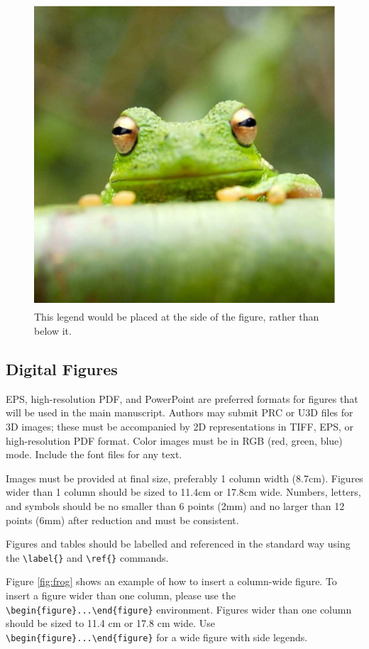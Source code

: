 \documentclass[9pt,twocolumn,twoside,lineno]{pnas-new}
\begin{document}
\begin{figure}
\centering
\includegraphics[width=11.4cm,height=11.4cm]{frog}
\caption{This legend would be placed at the side of the figure, rather than below it.}\label{fig:side}
\end{figure}

\subsection*{Digital Figures}

EPS, high-resolution PDF, and PowerPoint are preferred formats for figures that will be used in the main manuscript. Authors may submit PRC or U3D files for 3D images; these must be accompanied by 2D representations in TIFF, EPS, or high-resolution PDF format. Color images must be in RGB (red, green, blue) mode. Include the font files for any text.

Images must be provided at final size, preferably 1 column width (8.7cm). Figures wider than 1 column should be sized to 11.4cm or 17.8cm wide. Numbers, letters, and symbols should be no smaller than 6 points (2mm) and no larger than 12 points (6mm) after reduction and must be consistent. 

Figures and tables should be labelled and referenced in the standard way using the \verb|\label{}| and \verb|\ref{}| commands.

Figure \ref{fig:frog} shows an example of how to insert a column-wide figure. To insert a figure wider than one column, please use the \verb|\begin{figure}...\end{figure}| environment. Figures wider than one column should be sized to 11.4 cm or 17.8 cm wide. Use \verb|\begin{figure}...\end{figure}| for a wide figure with side legends.
\end{document}
